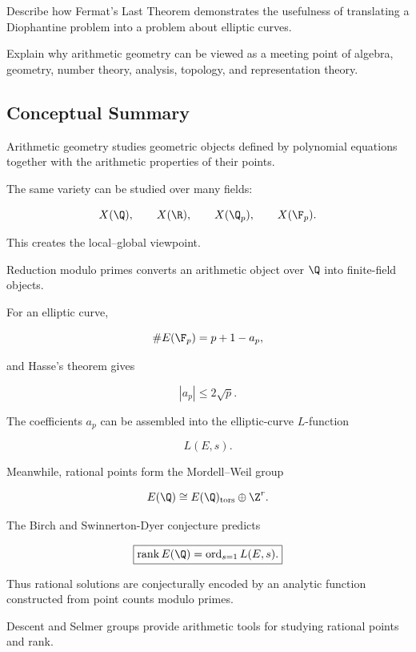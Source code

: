 \begin{exercise}[3]
Describe how Fermat's Last Theorem demonstrates the usefulness of translating
a Diophantine problem into a problem about elliptic curves.
\end{exercise}

\begin{exercise}[3]
Explain why arithmetic geometry can be viewed as a meeting point of algebra,
geometry, number theory, analysis, topology, and representation theory.
\end{exercise}

\subsection{Conceptual Summary}
\label{subsec:arithmetic-geometry-summary}

Arithmetic geometry studies geometric objects defined by polynomial
equations together with the arithmetic properties of their points.

The same variety can be studied over many fields:

\[
X(\Q),\qquad
X(\R),\qquad
X(\Q_p),\qquad
X(\F_p).
\]

This creates the local--global viewpoint.

Reduction modulo primes converts an arithmetic object over \(\Q\) into
finite-field objects.

For an elliptic curve,

\[ \#E(\F_p)=p+1-a_p, \]

and Hasse's theorem gives

\[ |a_p|\leq2\sqrt p. \]

The coefficients \(a_p\) can be assembled into the elliptic-curve
\(L\)-function

\[ L(E,s). \]

Meanwhile, rational points form the Mordell--Weil group

\[ E(\Q)\cong E(\Q)_{\mathrm{tors}}\oplus\Z^r. \]

The Birch and Swinnerton-Dyer conjecture predicts

\[
\boxed{
\operatorname{rank}E(\Q)
=
\operatorname{ord}_{s=1}L(E,s).
}
\]

Thus rational solutions are conjecturally encoded by an analytic function
constructed from point counts modulo primes.

Descent and Selmer groups provide arithmetic tools for studying rational
points and rank.

